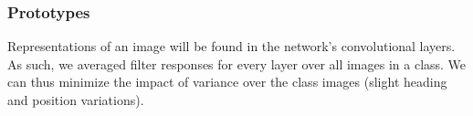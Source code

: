 


\subsubsection{Prototypes}
Representations of an image will be found in the network's convolutional layers. As such, we averaged filter responses for every layer over all images in a class. We can thus minimize the impact of variance over the class images (slight heading and position variations).